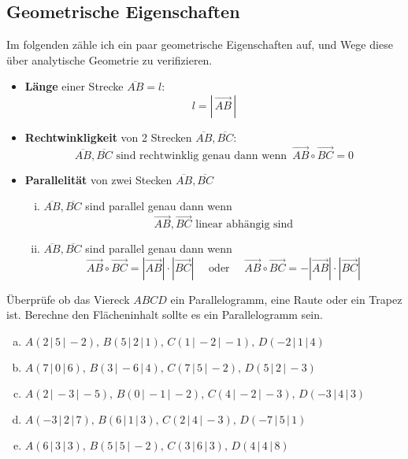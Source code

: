 \documentclass[a4paper,12pt]{article}
\newcommand{\Aufgabe}[2]{
	{
		\vspace*{0.3cm}
		\begin{tcolorbox}[breakable,colback=yellow!0,colframe=black!65!white,title=\textbf{Aufgabe #1:},width=\linewidth ]
			{#2}
		\end{tcolorbox}
		
		
	}
}
\begin{document}
	\subsection{Geometrische Eigenschaften}
	Im folgenden zähle ich ein paar geometrische Eigenschaften auf, und Wege diese über analytische Geometrie 
	zu verifizieren.
	\begin{itemize}
		\item \textbf{Länge} einer Strecke $\overline{AB}=l$: \[l=\left\vert\, \vec{AB} \,\right \vert\]
		\item \textbf{Rechtwinkligkeit} von 2 Strecken $\overline{AB},\overline{BC}$:
		\[\overline{AB},\overline{BC} \text{ sind rechtwinklig genau dann wenn }\, \vec{AB}\circ \vec{BC}=0\]
		\item \textbf{Parallelität} von zwei Stecken $\overline{AB},\overline{BC}$
			\begin{enumerate}[(i)]
				\item $\overline{AB},\overline{BC}$ sind parallel genau dann wenn
					\[\vec{AB},\vec{BC} \text{ linear abhängig sind}\]
				\item $\overline{AB},\overline{BC}$ sind parallel genau dann wenn
					\[\vec{AB}\circ\vec{BC} = |\vec{AB}|\cdot |\vec{BC}|\quad\text{ oder }\quad\vec{AB}\circ\vec{BC} = -|\vec{AB}|\cdot |\vec{BC}|\]
			\end{enumerate}
	\end{itemize} 
	\Aufgabe{(Vierecke)}{
		Überprüfe ob das Viereck $ABCD$ ein Parallelogramm, eine Raute oder ein Trapez ist.
		Berechne den Flächeninhalt sollte es ein Parallelogramm sein.
		
			\begin{enumerate}[(a)]
				\item $A( 2\,|\,5 \,|\,-2 ),\, B( 5\,|\,2 \,|\, 1),\,C(1 \,|\,-2 \,|\,-1 ),\, D(-2 \,|\,1 \,|\,4 )$
				\item $A( 7\,|\,0 \,|\,6 ),\, B(3 \,|\,-6 \,|\, 4),\,C(7 \,|\,5 \,|\,-2 ),\, D( 5\,|\,2 \,|\, -3)$
				\item $A( 2\,|\,-3 \,|\,-5 ),\, B(0 \,|\, -1\,|\, -2),\,C(4 \,|\,-2 \,|\,-3 ),\, D(-3 \,|\, 4\,|\,3 )$
				\item $A( -3\,|\,2 \,|\,7 ),\, B( 6\,|\,1 \,|\, 3),\,C( 2\,|\,4 \,|\,-3 ),\, D( -7\,|\,5 \,|\,1 )$
				\item $A( 6\,|\,3 \,|\,3 ),\, B(5 \,|\, 5\,|\, -2),\,C( 3\,|\,6 \,|\,3 ),\, D( 4\,|\,4 \,|\,8 )$
			\end{enumerate}
		
	}
\end{document}
